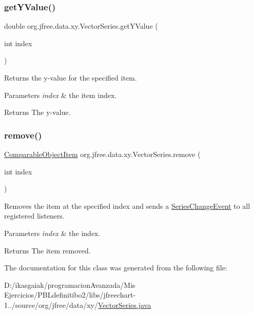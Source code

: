 \subsubsection{\texorpdfstring{get\+Y\+Value()}{getYValue()}}
{\footnotesize\ttfamily double org.\+jfree.\+data.\+xy.\+Vector\+Series.\+get\+Y\+Value (\begin{DoxyParamCaption}\item[{int}]{index }\end{DoxyParamCaption})}

Returns the y-\/value for the specified item.


\begin{DoxyParams}{Parameters}
{\em index} & the item index.\\
\hline
\end{DoxyParams}
\begin{DoxyReturn}{Returns}
The y-\/value. 
\end{DoxyReturn}
\mbox{\label{classorg_1_1jfree_1_1data_1_1xy_1_1_vector_series_ab5cfdd6aeb9d395ba04156654e1c30a0}} 
\subsubsection{\texorpdfstring{remove()}{remove()}}
{\footnotesize\ttfamily \mbox{\hyperlink{classorg_1_1jfree_1_1data_1_1_comparable_object_item}{Comparable\+Object\+Item}} org.\+jfree.\+data.\+xy.\+Vector\+Series.\+remove (\begin{DoxyParamCaption}\item[{int}]{index }\end{DoxyParamCaption})}

Removes the item at the specified index and sends a \mbox{\hyperlink{}{Series\+Change\+Event}} to all registered listeners.


\begin{DoxyParams}{Parameters}
{\em index} & the index.\\
\hline
\end{DoxyParams}
\begin{DoxyReturn}{Returns}
The item removed. 
\end{DoxyReturn}


The documentation for this class was generated from the following file\+:\begin{DoxyCompactItemize}
\item 
D\+:/ikasgaiak/programacion\+Avanzada/\+Mis Ejercicios/\+P\+B\+Ldefinitibo2/libs/jfreechart-\/1../source/org/jfree/data/xy/\mbox{\hyperlink{_vector_series_8java}{Vector\+Series.\+java}}\end{DoxyCompactItemize}
